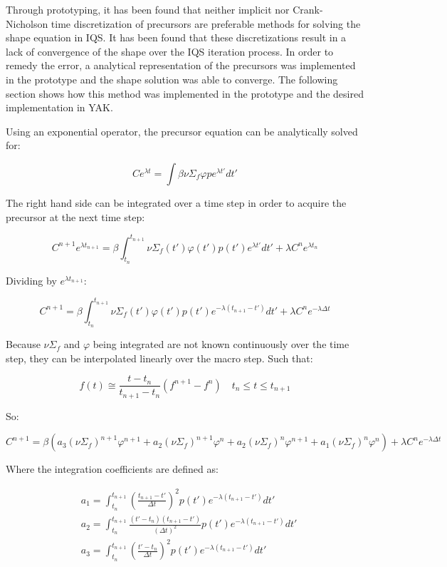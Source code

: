 \documentclass[11pt]{tamurmemo}
\newcommand{\be}{\begin{equation}}
\newcommand{\ee}{\end{equation}}
\begin{document}
Through prototyping, it has been found that neither implicit nor Crank-Nicholson time discretization of precursors are preferable methods for solving the shape equation in IQS.  It has been found that these discretizations result in a lack of convergence of the shape over the IQS iteration process.  In order to remedy the error, a analytical representation of the precursors was implemented in the prototype and the shape solution was able to converge.  The following section shows how this method was implemented in the prototype and the desired implementation in YAK.

Using an exponential operator, the precursor equation can be analytically solved for:

\be
Ce^{\lambda t}=\int\beta\nu\Sigma_f\varphi pe^{\lambda t'}dt'
\ee

The right hand side can be integrated over a time step in order to acquire the precursor at the next time step:

\be
C^{n+1}e^{\lambda t_{n+1}}=\beta\int_{t_n}^{t_{n+1}}\nu\Sigma_f(t')\varphi(t') p(t')e^{\lambda t'}dt' + \lambda C^n e^{\lambda t_n}
\ee

Dividing by $e^{\lambda t_{n+1}}$:

\be
C^{n+1} = \beta\int_{t_n}^{t_{n+1}}\nu\Sigma_f(t')\varphi(t') p(t')e^{-\lambda (t_{n+1}-t')}dt' + \lambda C^n e^{-\lambda \Delta t}
\ee

Because $\nu\Sigma_f$ and $\varphi$ being integrated are not known continuously over the time step, they can be interpolated linearly over the macro step.  Such that:

\be
f(t) \cong \frac{t-t_n}{t_{n+1}-t_n}(f^{n+1}-f^n) \quad t_n \le t \le t_{n+1}
\ee

So:

\be
C^{n+1} = \beta\left(a_3(\nu\Sigma_f)^{n+1}\varphi^{n+1}+a_2(\nu\Sigma_f)^{n+1}\varphi^n + a_2(\nu\Sigma_f)^n\varphi^{n+1} + a_1(\nu\Sigma_f)^n\varphi^n\right) + \lambda C^n e^{-\lambda \Delta t}
\ee

Where the integration coefficients are defined as:

\begin{align}
&a_1 = \int_{t_n}^{t_{n+1}}\left(\frac{t_{n+1}-t'}{\Delta t}\right)^2p(t')e^{-\lambda(t_{n+1}-t')}dt' \\
&a_2= \int_{t_n}^{t_{n+1}}\frac{(t'-t_n)(t_{n+1}-t')}{(\Delta t)^2}p(t')e^{-\lambda(t_{n+1}-t')}dt' \\
&a_3 = \int_{t_n}^{t_{n+1}}\left(\frac{t'-t_n}{\Delta t}\right)^2p(t')e^{-\lambda(t_{n+1}-t')}dt'
\end{align}
\end{document}
